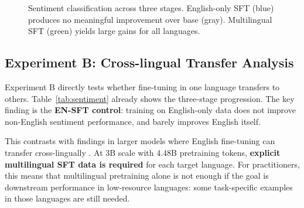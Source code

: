 \documentclass[10pt,twocolumn]{article}
\begin{document}
\begin{figure}[H]
\centering
{}
\caption{Sentiment classification across three stages. English-only SFT (blue) produces no meaningful improvement over base (gray). Multilingual SFT (green) yields large gains for all languages.}
\label{fig:sentiment}
\end{figure}

\subsection{Experiment B: Cross-lingual Transfer Analysis}
\label{sec:exp_b}

Experiment B directly tests whether fine-tuning in one language transfers to others. Table~\ref{tab:sentiment} already shows the three-stage progression. The key finding is the \textbf{EN-SFT control}: training on English-only data does not improve non-English sentiment performance, and barely improves English itself.

This contrasts with findings in larger models where English fine-tuning can transfer cross-lingually \citep{conneau2020unsupervised}. At 3B scale with 4.48B pretraining tokens, \textbf{explicit multilingual SFT data is required} for each target language. For practitioners, this means that multilingual pretraining alone is not enough if the goal is downstream performance in low-resource languages: some task-specific examples in those languages are still needed.
\end{document}
